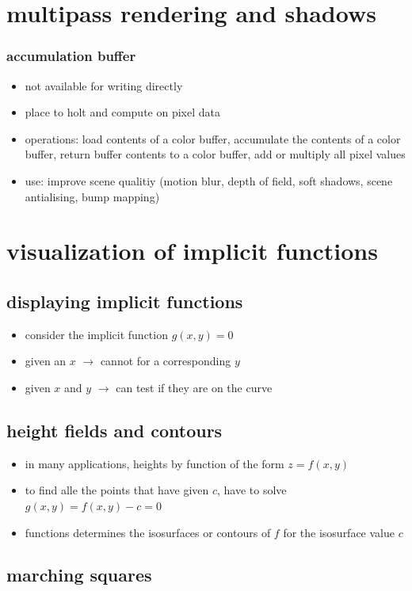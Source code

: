 \documentclass[11pt,a4paper]{article}
\begin{document}
\section{multipass rendering and shadows}
\subsubsection{accumulation buffer}
\begin{itemize}
	\item not available for writing directly
	\item place to holt and compute on pixel data
	\item operations: load contents of a color buffer, accumulate the contents of a color buffer, return buffer contents to a color buffer, add or multiply all pixel values
	\item use: improve scene qualitiy (motion blur, depth of field, soft shadows, scene antialising, bump mapping)
\end{itemize}

\section{visualization of implicit functions}
\subsection{displaying implicit functions}
\begin{itemize}
	\item consider the implicit function $g(x,y)=0$
	\item given an $x$ $\rightarrow$ cannot for a corresponding  $y$
	\item given $x$ and $y$ $\rightarrow$ can test if they are on the curve
\end{itemize}
\subsection{height fields and contours}
\begin{itemize}
	\item in many applications, heights by function of the form $z=f(x,y)$
	\item to find alle the points that have given $c$, have to solve $g(x,y)=f(x,y)-c=0$
	\item functions determines the isosurfaces or contours of $f$ for the isosurface value $c$
\end{itemize}
\subsection{marching squares}
\end{document}

